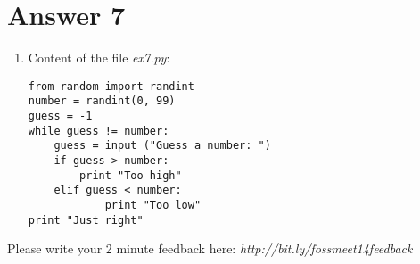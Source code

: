 \documentclass[11pt,a4paper]{article}
\begin{document}
\section*{Answer 7}
\begin{enumerate}
\item Content of the file {\it ex7.py}:
\begin{verbatim}
from random import randint
number = randint(0, 99)
guess = -1
while guess != number: 
    guess = input ("Guess a number: ")
    if guess > number:
        print "Too high"
    elif guess < number:
            print "Too low"
print "Just right"
\end{verbatim}
\end{enumerate}

\vspace*{2cm}
Please write your 2 minute feedback here: {\it http://bit.ly/fossmeet14feedback}
\end{document}
